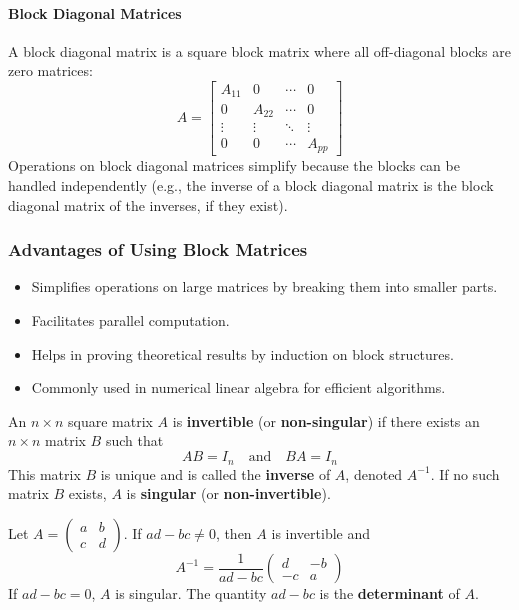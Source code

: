\paragraph*{Block Diagonal Matrices}
A block diagonal matrix is a square block matrix where all off-diagonal blocks are zero matrices:
\[
A = \begin{bmatrix}
    A_{11} & 0 & \cdots & 0 \\
    0 & A_{22} & \cdots & 0 \\
    \vdots & \vdots & \ddots & \vdots \\
    0 & 0 & \cdots & A_{pp}
\end{bmatrix}
\]
Operations on block diagonal matrices simplify because the blocks can be handled independently (e.g., the inverse of a block diagonal matrix is the block diagonal matrix of the inverses, if they exist).

\subsubsection*{Advantages of Using Block Matrices}
\begin{itemize}
    \item Simplifies operations on large matrices by breaking them into smaller parts.
    \item Facilitates parallel computation.
    \item Helps in proving theoretical results by induction on block structures.
    \item Commonly used in numerical linear algebra for efficient algorithms.
\end{itemize}


\begin{definition}
An $n \times n$ square matrix $A$ is \textbf{invertible} (or \textbf{non-singular}) if there exists an $n \times n$ matrix $B$ such that
\[ AB = I_n \quad \text{and} \quad BA = I_n \]
This matrix $B$ is unique and is called the \textbf{inverse} of $A$, denoted $A^{-1}$.
If no such matrix $B$ exists, $A$ is \textbf{singular} (or \textbf{non-invertible}).
\end{definition}



\begin{example}
Let $A = \begin{pmatrix} a & b \\ c & d \end{pmatrix}$.
If $ad-bc \neq 0$, then $A$ is invertible and
\[ A^{-1} = \frac{1}{ad-bc} \begin{pmatrix} d & -b \\ -c & a \end{pmatrix} \]
If $ad-bc = 0$, $A$ is singular. The quantity $ad-bc$ is the \textbf{determinant} of $A$.
\end{example}

